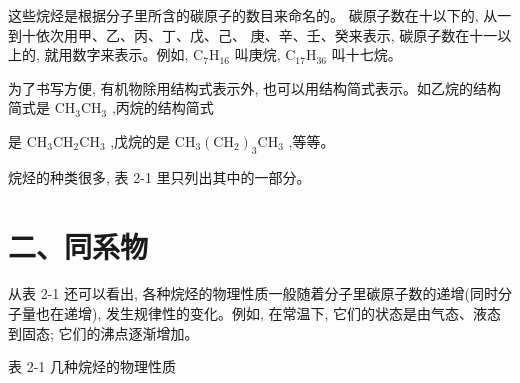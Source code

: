 \documentclass[10pt]{article}
\begin{document}
这些烷烃是根据分子里所含的碳原子的数目来命名的。 碳原子数在十以下的, 从一到十依次用甲、乙、丙、丁、戊、己、 庚、辛、壬、癸来表示, 碳原子数在十一以上的, 就用数字来表示。例如, \({\mathrm{C}}_{7}{\mathrm{H}}_{16}\) 叫庚烷, \({\mathrm{C}}_{17}{\mathrm{H}}_{36}\) 叫十七烷。

为了书写方便, 有机物除用结构式表示外, 也可以用结构简式表示。如乙烷的结构简式是 \({\mathrm{{CH}}}_{3}{\mathrm{{CH}}}_{3}\) ,丙烷的结构简式

是 \({\mathrm{{CH}}}_{3}{\mathrm{{CH}}}_{2}{\mathrm{{CH}}}_{3}\) ,戊烷的是 \({\mathrm{{CH}}}_{3}{\left( {\mathrm{{CH}}}_{2}\right) }_{3}{\mathrm{{CH}}}_{3}\) ,等等。

烷烃的种类很多, 表 2-1 里只列出其中的一部分。

\section*{二、同系物}

从表 2-1 还可以看出, 各种烷烃的物理性质一般随着分子里碳原子数的递增(同时分子量也在递增), 发生规律性的变化。例如, 在常温下, 它们的状态是由气态、液态到固态; 它们的沸点逐渐增加。

表 2-1 几种烷烃的物理性质
\end{document}
